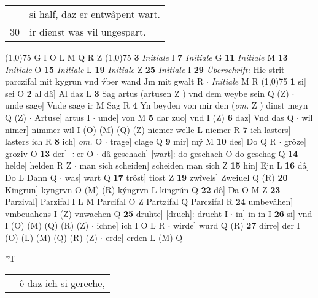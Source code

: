 \documentclass[8pt,a4paper,notitlepage]{article}
\begin{document}
\begin{table}[ht]
\begin{minipage}[t]{0.5\linewidth}
\begin{tabular}{rl}
 & si half, daz er entwâpent wart.\\ 
30 & ir dienst was vil ungespart.\\ 
\end{tabular}
\scriptsize
\line(1,0){75} \newline
G I O L M Q R Z \newline
\line(1,0){75} \newline
\textbf{3} \textit{Initiale} I  \textbf{7} \textit{Initiale} G  \textbf{11} \textit{Initiale} M  \textbf{13} \textit{Initiale} O  \textbf{15} \textit{Initiale} L  \textbf{19} \textit{Initiale} Z  \textbf{25} \textit{Initiale} I  \textbf{29} \textit{Überschrift:} Hie strit parczifal mit kygrun vnd v́ber wand Jm mit gwalt R   $\cdot$ \textit{Initiale} M R  \newline
\line(1,0){75} \newline
\textbf{1} si] sei O \textbf{2} al dâ] Al daz L \textbf{3} Sag artus (artusen Z ) vnd dem weybe sein Q (Z)  $\cdot$ unde sage] Vnde sage ir M Sag R \textbf{4} Yn beyden von mir den (\textit{om.} Z ) dinst meyn Q (Z)  $\cdot$ Artuse] artus I  $\cdot$ unde] von M \textbf{5} dar zuo] vnd I (Z) \textbf{6} daz] Vnd das Q  $\cdot$ wil nimer] nimmer wil I (O) (M) (Q) (Z) niemer welle L niemer R \textbf{7} ich lasters] lasters ich R \textbf{8} ich] \textit{om.} O  $\cdot$ trage] clage Q \textbf{9} mir] mÿ M \textbf{10} des] Do Q R  $\cdot$ grôze] groziv O \textbf{13} der] ÷er O  $\cdot$ dâ geschach] [wart]: do geschach O do geschag Q \textbf{14} helde] helden R Z  $\cdot$ man sich scheiden] scheiden man sich Z \textbf{15} hin] Ejn L \textbf{16} dâ] Do L Dann Q  $\cdot$ was] wart Q \textbf{17} trôst] tiost Z \textbf{19} zwîvels] Zweiuel Q (R) \textbf{20} Kingrun] kyngrvn O (M) (R) kýngrvn L kingrún Q \textbf{22} dô] Da O M Z \textbf{23} Parzival] Parzifal I L M Parcifal O Z Partzifal Q Parczifal R \textbf{24} umbevâhen] vmbeuahens I (Z) vnwachen Q \textbf{25} druhte] [druch]: drucht I  $\cdot$ in] in in I \textbf{26} si] vnd I (O) (M) (Q) (R) (Z)  $\cdot$ ichne] ich I O L R  $\cdot$ wirde] wurd Q (R) \textbf{27} dirre] der I (O) (L) (M) (Q) (R) (Z)  $\cdot$ erde] erden L (M) Q \newline
\end{minipage}
\hspace{0.5cm}
\begin{minipage}[t]{0.5\linewidth}
\small
\begin{center}*T
\end{center}
\begin{tabular}{rl}
 & ê daz ich si gereche,\\ 

\end{tabular}
\end{minipage}
\end{table}
\end{document}
